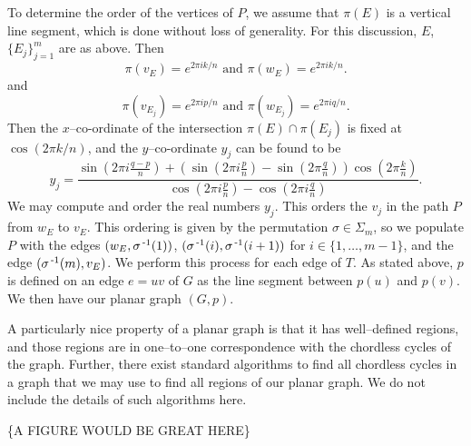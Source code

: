 To determine the order of the vertices of $P$, we assume that $\pi(E)$ is a vertical line segment, which is done without loss of generality.
For this discussion, $E$, $\{E_j\}_{j=1}^m$ are as above.
Then
\[
  \pi(v_E)=e^{2\pi i k/n}\text{ and }\pi(w_E)=e^{2\pi i k/n}.
\]
and
\[
  \pi(v_{E_j})=e^{2\pi i p/n}\text{ and }\pi(w_{E_j})=e^{2\pi i q/n}.
\]
Then the $x$--co-ordinate of the intersection $\pi(E)\cap\pi(E_j)$ is fixed at $\cos(2\pi k/n)$, and the $y$--co-ordinate $y_j$ can be found to be
\[
  y_j = \frac{\sin(2\pi i \frac{q-p}{n}) + (\sin(2\pi i \frac{p}{n}) - \sin(2\pi \frac{q}{n}))\cos(2\pi \frac{k}{n})}{\cos(2\pi i \frac{p}{n})-\cos(2\pi i \frac{q}{n})}.
\]
We may compute and order the real numbers $y_j$.
This orders the $v_j$ in the path $P$ from $w_E$ to $v_E$.
This ordering is given by the permutation $\sigma\in \Sigma_m$, so we populate $P$ with the edges $(w_E,\sigma^{\,\text{-}1}(1))$, $(\sigma^{\,\text{-}1}(i),\sigma^{\,\text{-}1}(i+1))$ for $i\in\{1,\dots,m-1\}$, and the edge $(\sigma^{\,\text{-}1}(m),v_E)$.
We perform this process for each edge of $T$.
As stated above, $p$ is defined on an edge $e=uv$ of $G$ as the line segment between $p(u)$ and $p(v)$.
We then have our planar graph $(G,p)$.

A particularly nice property of a planar graph is that it has well--defined regions, and those regions are in one--to--one correspondence with the chordless cycles of the graph.
Further, there exist standard algorithms to find all chordless cycles in a graph that we may use to find all regions of our planar graph.
We do not include the details of such algorithms here.

\{A FIGURE WOULD BE GREAT HERE\}
